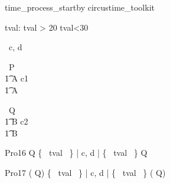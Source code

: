 \begin{zsection}
   \SECTION time\_process\_startby \parents circustime\_toolkit
\end{zsection}


\begin{axdef}
   tval: \nat
\where
   tval > 20 \land tval<30
\end{axdef}



\begin{circus}
   \circchannel\ c, d \\
\end{circus}



\begin{circus}
    \circprocess\ P \circdef  \circbegin  \\
    \t1 A \circdef c1 \then \Skip \\
    \t1 \circspot A \\
    \circend
\end{circus}



\begin{circus}
    \circprocess\ Q \circdef  \circbegin  \\
    \t1 B \circdef c2 \then \Skip \\
    \t1 \circspot B \\
    \circend
\end{circus}



\begin{circus}
    \circprocess Pro16 \circdef {} \rcirctime \circstartby Q \lpar \{~ tval ~\} | \lchanset c, d \rchanset | \{~ tval ~\} \rpar  {} \rcirctime \circstartby Q \\
\end{circus}

\begin{circus}
    \circprocess Pro17 \circdef (  \rcirctime \circstartby Q) \lpar \{~ tval ~\} | \lchanset c, d \rchanset | \{~ tval ~\} \rpar (  \rcirctime \circstartby Q) \\
\end{circus}



